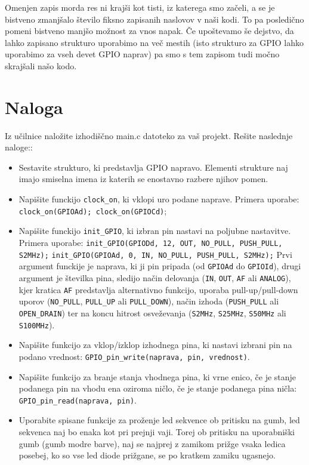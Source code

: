 \documentclass[12pt,letterpaper]{article}
\begin{document}
Omenjen zapis morda res ni krajši kot tisti, iz katerega smo začeli, a se je bistveno zmanjšalo število fiksno zapisanih naslovov v naši kodi. To pa posledično pomeni bistveno manjšo možnost za vnos napak. Če upoštevamo še dejstvo, da lahko zapisano strukturo uporabimo na več mestih (isto strukturo za GPIO lahko uporabimo za vseh devet GPIO naprav) pa smo s tem zapisom tudi močno skrajšali našo kodo.


\section*{Naloga}

Iz učilnice naložite izhodiščno main.c datoteko za vaš projekt. Rešite naslednje naloge::

\begin{itemize}
    \item Sestavite strukturo, ki predstavlja GPIO napravo. Elementi strukture naj imajo smiselna imena iz katerih se enostavno razbere njihov pomen.
    \item Napišite funckijo \texttt{clock\_on}, ki vklopi uro podane naprave. Primera uporabe: \texttt{clock\_on(GPIOAd); clock\_on(GPIOCd)};
    \item Napišite funckijo \texttt{init\_GPIO}, ki izbran pin nastavi na poljubne nastavitve. Primera uporabe:
    \newline \texttt{init\_GPIO(GPIODd, 12, OUT, NO\_PULL, PUSH\_PULL, S2MHz);}
    \newline \texttt{init\_GPIO(GPIOAd, 0, IN, NO\_PULL, PUSH\_PULL, S2MHz);}
    \newline Prvi argument funckije je naprava, ki ji pin pripada (od \texttt{GPIOAd} do \texttt{GPIOId}), drugi argument je številka pina, sledijo način delovanja (\texttt{IN}, \texttt{OUT}, \texttt{AF} ali \texttt{ANALOG}), kjer kratica \texttt{AF} predstavlja alternativno funkcijo, uporaba pull-up/pull-down uporov (\texttt{NO\_PULL}, \texttt{PULL\_UP} ali \texttt{PULL\_DOWN}), način izhoda (\texttt{PUSH\_PULL} ali \texttt{OPEN\_DRAIN}) ter na koncu hitrost osve\-že\-va\-nja (\texttt{S2MHz}, \texttt{S25MHz}, \texttt{S50MHz} ali \texttt{S100MHz}).
    \item Napišite funkcijo za vklop/izklop izhodnega pina, ki nastavi izbrani pin na podano vrednost: \texttt{GPIO\_pin\_write(naprava, pin, vrednost)}.
    \item Napišite funkcijo za branje stanja vhodnega pina, ki vrne enico, če je stanje podanega pin na vhodu ena oziroma ničlo, če je stanje podanega pina ničla: \texttt{GPIO\_pin\_read(naprava, pin)}.
    \item Uporabite spisane funkcije za proženje led sekvence ob pritisku na gumb, led sekvenca naj bo enaka kot pri prejnji vaji. Torej ob pritisku na uporabniški gumb (gumb modre barve), naj se najprej z zamikom prižge vsaka ledica posebej, ko so vse led diode prižgane, se po kratkem zamiku ugasnejo.
\end{itemize}
\end{document}
